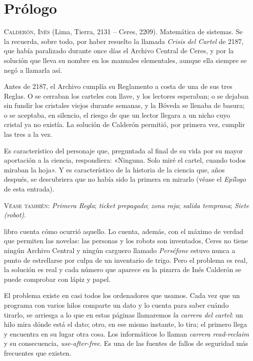 \chapter{Prólogo}

\begin{documento}
\textsc{Calderón, Inés} (Lima, Tierra, 2131 -- Ceres, 2209). Matemática de sistemas. Se la recuerda, sobre todo, por haber resuelto la llamada \emph{Crisis del Cartel} de 2187, que había paralizado durante once días el Archivo Central de Ceres, y por la solución que lleva su nombre en los manuales elementales, aunque ella siempre se negó a llamarla así.

Antes de 2187, el Archivo cumplía su Reglamento a costa de una de sus tres Reglas. O se cerraban los carteles con llave, y los lectores esperaban; o se dejaban sin fundir los cristales viejos durante semanas, y la Bóveda se llenaba de basura; o se aceptaba, en silencio, el riesgo de que un lector llegara a un nicho cuyo cristal ya no existía. La solución de Calderón permitió, por primera vez, cumplir las tres a la vez.

Es característico del personaje que, preguntada al final de su vida por su mayor aportación a la ciencia, respondiera: «Ninguna. Solo miré el cartel, cuando todos miraban la hoja». Y es característico de la historia de la ciencia que, años después, se descubriera que no había sido la primera en mirarlo (véase el \emph{Epílogo} de esta entrada).

\textsc{Véase también:} \emph{Primera Regla}; \emph{ticket prepagado}; \emph{zona roja}; \emph{salida temprana}; \emph{Siete (robot)}.
\end{documento}

\bigskip

 libro cuenta cómo ocurrió aquello. Lo cuenta, además, con el máximo de verdad que permiten las novelas: las personas y los robots son inventados, Ceres no tiene ningún Archivo Central y ningún carguero llamado \emph{Perséfone} estuvo nunca a punto de estrellarse por culpa de un inventario de trigo. Pero el problema es real, la solución es real y cada número que aparece en la pizarra de Inés Calderón se puede comprobar con lápiz y papel.

El problema existe en casi todos los ordenadores que usamos. Cada vez que un programa con varios hilos comparte un dato y lo cuenta para saber cuándo tirarlo, se arriesga a lo que en estas páginas llamaremos \emph{la carrera del cartel}: un hilo mira dónde está el dato; otro, en ese mismo instante, lo tira; el primero llega y encuentra en su lugar otra cosa. Los informáticos lo llaman \emph{carrera read-reclaim} y su consecuencia, \emph{use-after-free}. Es una de las fuentes de fallos de seguridad más frecuentes que existen.

